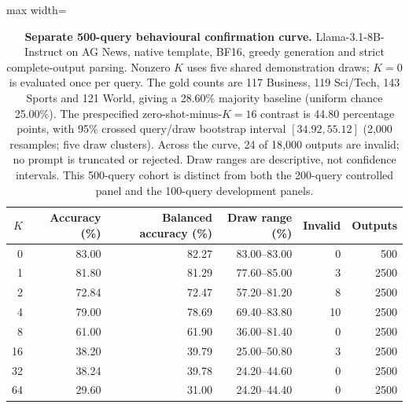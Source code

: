 \begingroup\color{blue}
\begin{table}[p]
\centering\color{blue}
\caption{\textbf{Separate 500-query behavioural confirmation curve.} Llama-3.1-8B-Instruct on AG News, native template, BF16, greedy generation and strict complete-output parsing. Nonzero $K$ uses five shared demonstration draws; $K=0$ is evaluated once per query. The gold counts are 117 Business, 119 Sci/Tech, 143 Sports and 121 World, giving a 28.60\% majority baseline (uniform chance 25.00\%). The prespecified zero-shot-minus-$K=16$ contrast is 44.80 percentage points, with 95\% crossed query/draw bootstrap interval $[34.92,55.12]$ (2,000 resamples; five draw clusters). Across the curve, 24 of 18,000 outputs are invalid; no prompt is truncated or rejected. Draw ranges are descriptive, not confidence intervals. This 500-query cohort is distinct from both the 200-query controlled panel and the 100-query development panels.}
\label{stab:baseline500}
\footnotesize
\begin{adjustbox}{max width=\textwidth}
\begin{tabular}{rrrrrr}
\toprule
$K$ & Accuracy (\%) & Balanced accuracy (\%) & Draw range (\%) & Invalid & Outputs \\
\midrule
0 & 83.00 & 82.27 & 83.00--83.00 & 0 & 500 \\
1 & 81.80 & 81.29 & 77.60--85.00 & 3 & 2500 \\
2 & 72.84 & 72.47 & 57.20--81.20 & 8 & 2500 \\
4 & 79.00 & 78.69 & 69.40--83.80 & 10 & 2500 \\
8 & 61.00 & 61.90 & 36.00--81.40 & 0 & 2500 \\
16 & 38.20 & 39.79 & 25.00--50.80 & 3 & 2500 \\
32 & 38.24 & 39.78 & 24.20--44.60 & 0 & 2500 \\
64 & 29.60 & 31.00 & 24.20--44.40 & 0 & 2500 \\
\bottomrule
\end{tabular}
\end{adjustbox}
\end{table}


